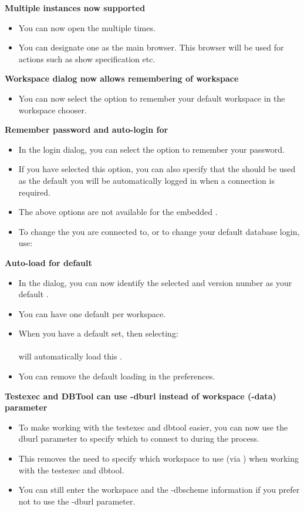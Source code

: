 \textbf{Multiple \gdtestcasebrowser{} instances now supported}
\begin{itemize}
\item You can now open the \gdtestcasebrowser{} multiple times.
\item You can designate one \gdtestcasebrowser{} as the main browser. This browser will be used for actions such as show specification etc.
\end{itemize}

\textbf{Workspace dialog now allows remembering of workspace}
\begin{itemize}
\item You can now select the option to remember your default workspace in the workspace chooser.
\end{itemize}

\textbf{Remember password and auto-login for \gddb{}}
\begin{itemize}
\item In the \gddb{} login dialog, you can select the option to remember your password. 
\item If you have selected this option, you can also specify that the \gddb{} should be used as the default \gddb{} you will be automatically logged in when a \gddb{} connection is required. 
\item The above options are not available for the embedded \gddb{}.
\item To change the \gddb{} you are connected to, or to change your default database login, use:\\
\end{itemize}

\textbf{Auto-load for default \gdproject{}}
\begin{itemize}
\item In the  dialog, you can now identify the selected \gdproject{} and version number as your default \gdproject{}.
\item You can have one default \gdproject{} per workspace. 
\item When you have a default \gdproject{} set, then selecting:\\
\\
will automatically load this \gdproject{}.
\item You can remove the default loading in the  preferences. 
\end{itemize}

\textbf{Testexec and DBTool can use -dburl instead of workspace (-data) parameter}
\begin{itemize}
\item To make working with the testexec and dbtool easier, you can now use the dburl parameter to specify which \gddb{} to connect to during the process.
\item This removes the need to specify which workspace to use (via ) when working with the testexec and dbtool. 
\item You can still enter the workspace and the -dbscheme information if you prefer not to use the -dburl parameter. 
\end{itemize}


